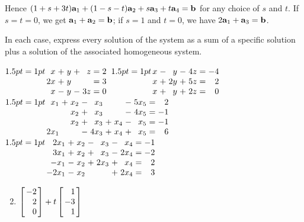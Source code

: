 \begin{multicols}{2}
\begin{ex}
\begin{sol}
\begin{enumerate}[label={\alph*.}]
Hence $(1 + s + 3t)\textbf{a}_{1} + (1 - s - t)\textbf{a}_{2} + s\textbf{a}_{3} + t\textbf{a}_{4} = \textbf{b}$ for any choice of $s$ and $t$. If $s = t = 0$, we get $\textbf{a}_{1} + \textbf{a}_{2} = \textbf{b}$; if $s = 1$ and $t = 0$, we have $2\textbf{a}_{1} + \textbf{a}_{3} = \textbf{b}$.

\end{enumerate}
\end{sol}
\end{ex}

\begin{ex}
In each case, express every solution of the system as a sum of a specific solution plus a solution of the associated homogeneous system.
\begin{exenumerate}
\exitem
$ \arraycolsep=1pt
\begin{array}[t]{rrrrrrr}
x & + & y & + & z & = & 2 \\
2x & + & y & & & = & 3 \\
x & - & y & - & 3z & = & 0
\end{array}
$
\exitem
$ \arraycolsep=1pt
\begin{array}[t]{rrrrrrr}
x & - & y & - & 4z & = & -4 \\
x & + & 2y & + & 5z & = & 2 \\
x & + & y & + & 2z & = & 0
\end{array}
$
\exitem*
$ \arraycolsep=1pt
\begin{array}[t]{rrrrrrrrrrr}
x_{1} & + & x_{2} & - & x_{3} & & & - & 5x_{5} & = & 2 \\
& & x_{2} & + & x_{3} & & & - & 4x_{5} & = & -1 \\
& & x_{2} & + & x_{3} & + & x_{4} & - & x_{5} & = & -1 \\
2x_{1} & & & - & 4x_{3} & + & x_{4} & + & x_{5} & = & 6
\end{array}
$
\exitem*
$ \arraycolsep=1pt
\begin{array}[t]{rrrrrrrrrrr}
2x_{1} & + & x_{2} & - & x_{3} & - & x_{4} & = & -1 \\
3x_{1} & + & x_{2} & + & x_{3} & - & 2x_{4} & = & -2 \\
-x_{1} & - & x_{2} & + & 2x_{3} & + & x_{4} & = & 2 \\
-2x_{1} & - & x_{2} & & & + & 2x_{4} & = & 3
\end{array}
$
\end{exenumerate}
\begin{sol}
\begin{enumerate}[label={\alph*.}]
\setcounter{enumi}{1}
\item
$\leftB \begin{array}{r}
-2 \\
2 \\
0
\end{array} \rightB + t \leftB \begin{array}{r}
1 \\
-3 \\
1
\end{array} \rightB$



\end{enumerate}
\end{sol}
\end{ex}
\end{multicols}
